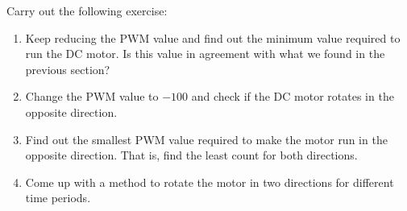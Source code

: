 




\begin{exercise} 
Carry out the following exercise:
\begin{enumerate}
\item Keep reducing the PWM value and find out the minimum value
  required to run the DC motor.  Is this value in agreement with what
  we found in the previous section?
\item Change the PWM value to $-100$ and check if the DC motor rotates
  in the opposite direction.
\item Find out the smallest PWM value required to make the motor run
  in the opposite direction.  That is, find the least count for both
  directions.
\item Come up with a method to rotate the motor in two directions for
  different time periods.
\end{enumerate}
\end{exercise}

